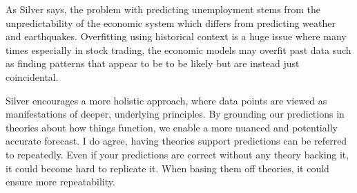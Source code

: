 \documentclass[12pt]{article}
\begin{document}
\begin{enumerate}
As Silver says, the problem with predicting unemployment stems from the unpredictability of the economic system which differs from predicting weather and earthquakes. Overfitting using historical context is a huge issue where many times especially in stock trading, the economic models may overfit past data such as finding patterns that appear to be to be likely but are instead just coincidental.


Silver encourages a more holistic approach, where data points are viewed as manifestations of deeper, underlying principles. By grounding our predictions in theories about how things function, we enable a more nuanced and potentially accurate forecast. I do agree, having theories support predictions can be referred to repeatedly. Even if your predictions are correct without any theory backing it, it could become hard to replicate it. When basing them off theories, it could ensure more repeatability.

\end{enumerate}



\end{document}
